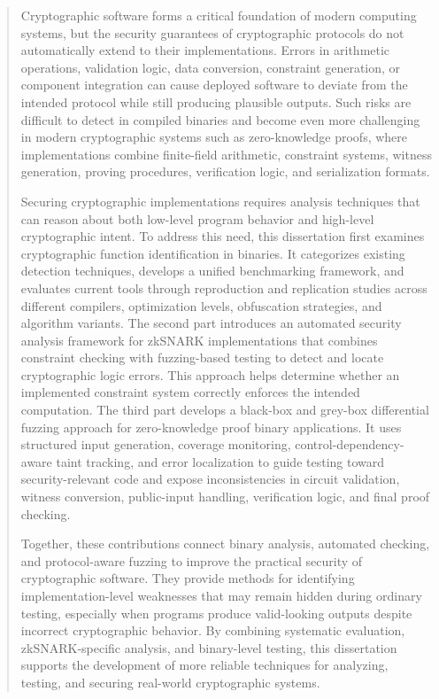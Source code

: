 
\begin{abstract}

Cryptographic software forms a critical foundation of modern computing systems, but the security guarantees of cryptographic protocols do not automatically extend to their implementations. Errors in arithmetic operations, validation logic, data conversion, constraint generation, or component integration can cause deployed software to deviate from the intended protocol while still producing plausible outputs. Such risks are difficult to detect in compiled binaries and become even more challenging in modern cryptographic systems such as zero-knowledge proofs, where implementations combine finite-field arithmetic, constraint systems, witness generation, proving procedures, verification logic, and serialization formats.

Securing cryptographic implementations requires analysis techniques that can reason about both low-level program behavior and high-level cryptographic intent. To address this need, this dissertation first examines cryptographic function identification in binaries. It categorizes existing detection techniques, develops a unified benchmarking framework, and evaluates current tools through reproduction and replication studies across different compilers, optimization levels, obfuscation strategies, and algorithm variants. The second part introduces an automated security analysis framework for zkSNARK implementations that combines constraint checking with fuzzing-based testing to detect and locate cryptographic logic errors. This approach helps determine whether an implemented constraint system correctly enforces the intended computation. The third part develops a black-box and grey-box differential fuzzing approach for zero-knowledge proof binary applications. It uses structured input generation, coverage monitoring, control-dependency-aware taint tracking, and error localization to guide testing toward security-relevant code and expose inconsistencies in circuit validation, witness conversion, public-input handling, verification logic, and final proof checking.

Together, these contributions connect binary analysis, automated checking, and protocol-aware fuzzing to improve the practical security of cryptographic software. They provide methods for identifying implementation-level weaknesses that may remain hidden during ordinary testing, especially when programs produce valid-looking outputs despite incorrect cryptographic behavior. By combining systematic evaluation, zkSNARK-specific analysis, and binary-level testing, this dissertation supports the development of more reliable techniques for analyzing, testing, and securing real-world cryptographic systems.

\end{abstract}
